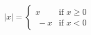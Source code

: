\begin{equation}   
|x|=\begin{cases}
 x  & \text{if }x\geq 0\\\
-x  & \text{if }x< 0
\end{cases}
\end{equation}
